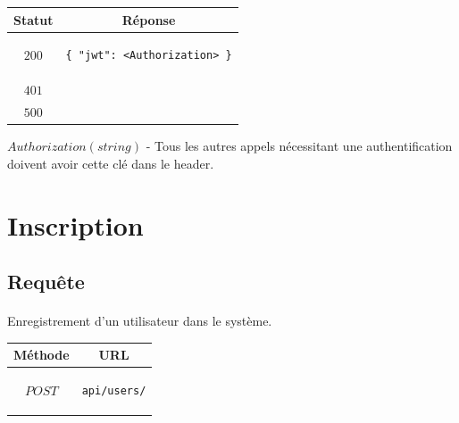 \documentclass[titlepage, 12pt]{report}
\begin{document}
\begin{center}
	\begin{tabular}{|c|c|}
		\hline
		Statut & Réponse \\
		\hline
		$ 200 $ & \begin{lstlisting}
{ "jwt": <Authorization> }
		\end{lstlisting} \\ 
		\hline
		$ 401 $ & \\
		\hline
		$ 500 $ & \\
		\hline
	\end{tabular}
\end{center}

\par $ Authorization ( string ) $ - Tous les autres appels nécessitant une
authentification doivent avoir cette clé dans le header.

%
%

\section{Inscription}

\subsection{Requête}

\paragraph{} Enregistrement d'un utilisateur dans le système.

\begin{center}
	\begin{tabular}{|c|c|}
	\hline
	Méthode & URL \\
	\hline
	$ POST $ 
	&
	\begin{lstlisting}
api/users/
	\end{lstlisting} 
	\\ \hline
	\end{tabular}
\end{center}
\end{document}
